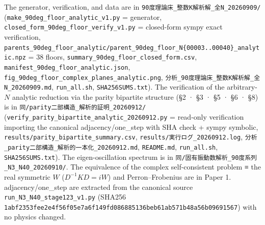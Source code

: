 \documentclass[
  a4paper,
]{ltjsarticle}
\begin{document}
The generator, verification, and data are in
\texttt{90度理論床\_整数K解析解\_全N\_20260909/}
(\texttt{make\_90deg\_floor\_analytic\_v1.py} = generator,
\texttt{closed\_form\_90deg\_floor\_verify\_v1.py} = closed-form sympy
exact verification,
\texttt{parents\_90deg\_floor\_analytic/parent\_90deg\_floor\_N\{00003..00040\}\_analytic.npz}
= 38 floors, \texttt{summary\_90deg\_floor\_closed\_form.csv},
\texttt{manifest\_90deg\_floor\_analytic.json},
\texttt{fig\_90deg\_floor\_complex\_planes\_analytic.png},
\texttt{分析\_90度理論床\_整数K解析解\_全N\_20260909.md},
\texttt{run\_all.sh}, \texttt{SHA256SUMS.txt}). The verification of the
arbitrary-\(N\) analytic reduction via the parity bipartite structure
(§2 · §3 · §5 · §6 · §8) is in
\texttt{同/parity二部構造\_解析的証明\_20260912/}
(\texttt{verify\_parity\_bipartite\_analytic\_20260912.py} = read-only
verification importing the canonical adjacency/one\_step with SHA check
+ sympy symbolic, \texttt{results/parity\_bipartite\_summary.csv},
\texttt{results/実行ログ\_20260912.log},
\texttt{分析\_parity二部構造\_解析的一本化\_20260912.md},
\texttt{README.md}, \texttt{run\_all.sh}, \texttt{SHA256SUMS.txt}). The
eigen-oscillation spectrum is in
\texttt{同/固有振動数解析\_90度系列\_N3\_N40\_20260910/}. The
equivalence of the complex self-consistent problem ≡ the real symmetric
\(W\) (\(D^{-1}KD=iW\)) and Perron--Frobenius are in Paper 1.
adjacency/one\_step are extracted from the canonical source
\texttt{run\_N3\_N40\_stage123\_v1.py} (SHA256
\texttt{1abf2353fee2e4f56f05e7a6f149fd086885136beb61ab571b48a56b09691567})
with no physics changed.
\end{document}
